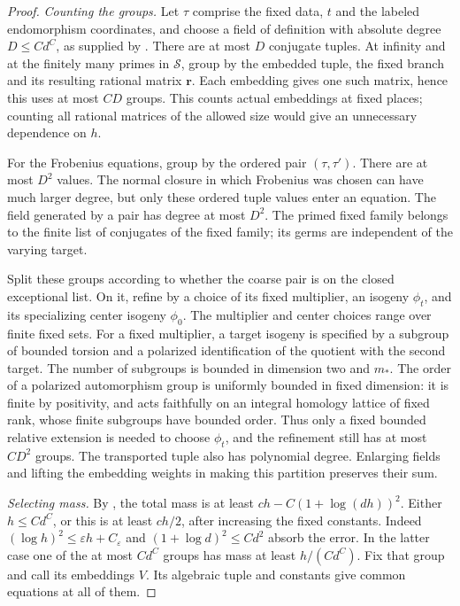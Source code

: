 \begin{proof}
\emph{Counting the groups.}
Let $\tau$ comprise the fixed data, $t$ and the labeled endomorphism
coordinates, and choose a field of definition with absolute degree
$D\leq Cd^C$, as supplied by .  There are at
most $D$ conjugate tuples.  At infinity and at the finitely many
primes in $\mathcal S$, group by the embedded tuple, the fixed branch
and its resulting rational matrix $\mathbf r$.  Each embedding gives
one such matrix, hence this uses at most $CD$ groups.  This counts
actual embeddings at fixed places; counting all rational matrices of
the allowed size would give an unnecessary dependence on $h$.

For the Frobenius equations, group by the ordered pair $(\tau,\tau')$.
There are at most $D^2$ values.  The normal closure in which Frobenius
was chosen can have much larger degree, but only these ordered tuple
values enter an equation.  The field generated by a pair has degree
at most $D^2$.  The primed fixed family belongs to the finite list of
conjugates of the fixed family; its germs are independent of the
varying target.

Split these groups according to whether the coarse pair is on the
closed exceptional list.  On it, refine by a choice of its fixed
multiplier, an isogeny $\phi_t$, and its specializing center isogeny
$\phi_0$.  The multiplier and center choices range over finite fixed
sets.  For a fixed multiplier, a target isogeny is specified by a
subgroup of bounded torsion and a polarized identification of the
quotient with the second target.  The number of subgroups is bounded
in dimension two and $m_*$.  The order of a polarized automorphism
group is uniformly bounded in fixed dimension: it is finite by
positivity, and acts faithfully on an integral homology lattice of
fixed rank, whose finite subgroups have bounded order.  Thus only a
fixed bounded relative extension is needed to choose $\phi_t$, and
the refinement still has at most $CD^2$ groups.  The transported tuple
also has polynomial degree.  Enlarging fields and lifting the
embedding weights in making this partition preserves their sum.

\emph{Selecting mass.}
By , the total mass is at least
$ch-C(1+\log(dh))^2$.  Either $h\leq Cd^C$, or this is at least
$ch/2$, after increasing the fixed constants.  Indeed
$(\log h)^2\leq\varepsilon h+C_\varepsilon$ and
$(1+\log d)^2\leq Cd^2$ absorb the error.  In the latter case one of
the at most $Cd^C$ groups has mass at least $h/(Cd^C)$.  Fix that
group and call its embeddings $V$.  Its algebraic tuple and constants
give common equations at all of them.


\end{proof}
